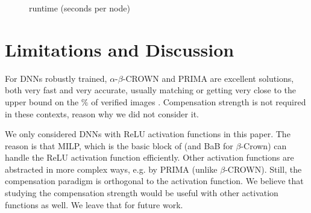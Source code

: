 \begin{figure}[h!]
	\centering
	\caption{runtime (seconds per node)}
	\label{fig2}
\end{figure}





\section{Limitations and Discussion}
\label{Discussion}

For DNNs robustly trained, $\alpha$-$\beta$-CROWN and PRIMA are excellent solutions, both very fast and very accurate, usually matching or getting very close \cite{crown} to the upper bound on the $\%$ of verified images \cite{attack}. Compensation strength is not required in these contexts, reason why we did not consider it.

We only considered DNNs with ReLU activation functions in this paper. The reason is that MILP, which is the basic block of {\toolname} (and BaB for $\beta$-Crown) can handle the ReLU activation function efficiently. Other activation functions are abstracted in more complex ways, e.g. by PRIMA (unlike $\beta$-CROWN). Still, the compensation paradigm is  orthogonal to the activation function. We believe that studying the compensation strength would be useful with other activation functions as well. We leave that for future work. 

